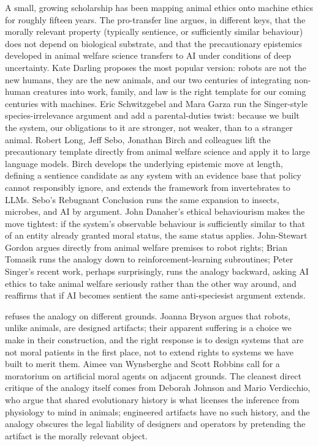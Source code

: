 A small, growing scholarship has been mapping animal ethics onto machine ethics for roughly fifteen years. The pro-transfer line argues, in different keys, that the morally relevant property (typically sentience, or sufficiently similar behaviour) does not depend on biological substrate, and that the precautionary epistemics developed in animal welfare science transfers to AI under conditions of deep uncertainty. Kate Darling proposes the most popular version: robots are not the new humans, they are the new animals, and our two centuries of integrating non-human creatures into work, family, and law is the right template for our coming centuries with machines\cite{darling2021newbreed}. Eric Schwitzgebel and Mara Garza run the Singer-style species-irrelevance argument and add a parental-duties twist: because we built the system, our obligations to it are stronger, not weaker, than to a stranger animal\cite{schwitzgebel2015airights,schwitzgebel2020designing}. Robert Long, Jeff Sebo, Jonathan Birch and colleagues lift the precautionary template directly from animal welfare science and apply it to large language models\cite{long2024aiwelfare}. Birch develops the underlying epistemic move at length, defining a sentience candidate as any system with an evidence base that policy cannot responsibly ignore, and extends the framework from invertebrates to LLMs\cite{birch2024edge}. Sebo's Rebugnant Conclusion runs the same expansion to insects, microbes, and AI by argument\cite{sebo2023rebugnant,sebo2024moralcircle}. John Danaher's ethical behaviourism makes the move tightest: if the system's observable behaviour is sufficiently similar to that of an entity already granted moral status, the same status applies\cite{danaher2020welcoming}. John-Stewart Gordon argues directly from animal welfare premises to robot rights\cite{gordon2020owe}; Brian Tomasik runs the analogy down to reinforcement-learning subroutines\cite{tomasik2014suffering}; Peter Singer's recent work, perhaps surprisingly, runs the analogy backward, asking AI ethics to take animal welfare seriously rather than the other way around, and reaffirms that if AI becomes sentient the same anti-speciesist argument extends\cite{singer2023ai}.

 refuses the analogy on different grounds. Joanna Bryson argues that robots, unlike animals, are designed artifacts; their apparent suffering is a choice we make in their construction, and the right response is to design systems that are not moral patients in the first place, not to extend rights to systems we have built to merit them\cite{bryson2010slaves,bryson2018patiency}. Aimee van Wynsberghe and Scott Robbins call for a moratorium on artificial moral agents on adjacent grounds\cite{vanwynsberghe2019moratorium}. The cleanest direct critique of the analogy itself comes from Deborah Johnson and Mario Verdicchio, who argue that shared evolutionary history is what licenses the inference from physiology to mind in animals; engineered artifacts have no such history, and the analogy obscures the legal liability of designers and operators by pretending the artifact is the morally relevant object\cite{johnson2018notlikeanimals}.

